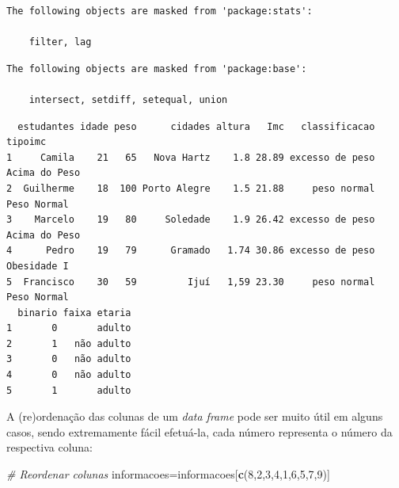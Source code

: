 \documentclass[12pt,brazil,oneside]{book}
\newenvironment{Shaded}{\begin{snugshade}}{\end{snugshade}}
\newcommand{\CommentTok}[1]{\textcolor[rgb]{0.56,0.35,0.01}{\textit{#1}}}
\newcommand{\DecValTok}[1]{\textcolor[rgb]{0.00,0.00,0.81}{#1}}
\newcommand{\KeywordTok}[1]{\textcolor[rgb]{0.13,0.29,0.53}{\textbf{#1}}}
\newcommand{\NormalTok}[1]{#1}
\newcommand{\OperatorTok}[1]{\textcolor[rgb]{0.81,0.36,0.00}{\textbf{#1}}}
\newcommand{\StringTok}[1]{\textcolor[rgb]{0.31,0.60,0.02}{#1}}
\begin{document}
\begin{verbatim}
The following objects are masked from 'package:stats':

    filter, lag
\end{verbatim}

\begin{verbatim}
The following objects are masked from 'package:base':

    intersect, setdiff, setequal, union
\end{verbatim}

\begin{Shaded}
\end{Shaded}

\begin{verbatim}
  estudantes idade peso      cidades altura   Imc   classificacao       tipoimc
1     Camila    21   65   Nova Hartz    1.8 28.89 excesso de peso Acima do Peso
2  Guilherme    18  100 Porto Alegre    1.5 21.88     peso normal   Peso Normal
3    Marcelo    19   80     Soledade    1.9 26.42 excesso de peso Acima do Peso
4      Pedro    19   79      Gramado   1.74 30.86 excesso de peso   Obesidade I
5  Francisco    30   59         Ijuí   1,59 23.30     peso normal   Peso Normal
  binario faixa etaria
1       0       adulto
2       1   não adulto
3       0   não adulto
4       0   não adulto
5       1       adulto
\end{verbatim}

A (re)ordenação das colunas de um \emph{data frame} pode ser muito útil
em alguns casos, sendo extremamente fácil efetuá-la, cada número
representa o número da respectiva coluna:

\begin{Shaded}
\begin{Highlighting}[]
\CommentTok{# Reordenar colunas}
\NormalTok{informacoes=informacoes[}\KeywordTok{c}\NormalTok{(}\DecValTok{8}\NormalTok{,}\DecValTok{2}\NormalTok{,}\DecValTok{3}\NormalTok{,}\DecValTok{4}\NormalTok{,}\DecValTok{1}\NormalTok{,}\DecValTok{6}\NormalTok{,}\DecValTok{5}\NormalTok{,}\DecValTok{7}\NormalTok{,}\DecValTok{9}\NormalTok{)]}
\end{Highlighting}
\end{Shaded}
\end{document}
